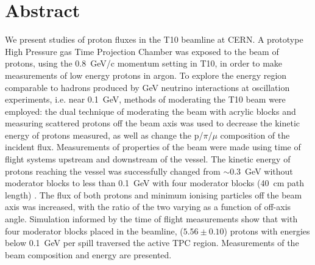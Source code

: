 \section*{Abstract}
We present studies of proton fluxes in the T10 beamline at CERN.
A prototype High Pressure gas Time Projection Chamber was exposed to the beam of protons, using the 0.8~GeV/c momentum setting in T10, in order to make measurements of low energy protons in argon.
To explore the energy region comparable to hadrons produced by GeV neutrino interactions at oscillation experiments, i.e. near 0.1~GeV, methods of moderating the T10 beam were employed:
the dual technique of moderating the beam with acrylic blocks and measuring scattered protons off the beam axis was used to decrease the kinetic energy of protons measured, as well as change the p/$\pi$/$\mu$ composition of the incident flux.
Measurements of properties of the beam were made using time of flight systems upstream and downstream of the vessel. 
The kinetic energy of protons reaching the vessel was successfully changed from $\sim$0.3~GeV without moderator blocks to less than 0.1~GeV with four moderator blocks (40~cm path length) .
The flux of both protons and minimum ionising particles off the beam axis was increased, with the ratio of the two varying as a function of off-axis angle. 
Simulation informed by the time of flight measurements show that with four moderator blocks placed in the beamline,  ($5.56 \pm 0.10$) protons with energies below 0.1~GeV per spill traversed the active TPC region.
Measurements of the beam composition and energy are presented.